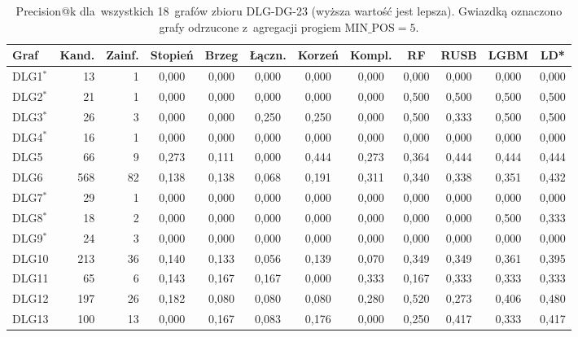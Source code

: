 \begin{table}[ht]
\centering
\caption[Precision@k dla~wszystkich 18~grafów DLG-DG-23]{Precision@k dla~wszystkich 18~grafów zbioru DLG-DG-23 (wyższa wartość jest lepsza). Gwiazdką oznaczono grafy odrzucone z~agregacji progiem $\mathrm{MIN\_POS} = 5$.}
\label{tab:dodb-precision-at-k}
\footnotesize
\setlength{\tabcolsep}{3.5pt}
\begin{tabular}{lrrccccccccc}
\toprule
\textbf{Graf} & \textbf{Kand.} & \textbf{Zainf.} & \textbf{Stopień} & \textbf{Brzeg} & \textbf{Łączn.} & \textbf{Korzeń} & \textbf{Kompl.} & \textbf{RF} & \textbf{RUSB} & \textbf{LGBM} & \textbf{LD*} \\
\midrule
DLG1$^{*}$ & 13 & 1 & 0{,}000 & 0{,}000 & 0{,}000 & 0{,}000 & 0{,}000 & 0{,}000 & 0{,}000 & 0{,}000 & 0{,}000 \\
DLG2$^{*}$ & 21 & 1 & 0{,}000 & 0{,}000 & 0{,}000 & 0{,}000 & 0{,}000 & 0{,}500 & 0{,}500 & 0{,}500 & 0{,}500 \\
DLG3$^{*}$ & 26 & 3 & 0{,}000 & 0{,}000 & 0{,}250 & 0{,}250 & 0{,}000 & 0{,}500 & 0{,}333 & 0{,}500 & 0{,}500 \\
DLG4$^{*}$ & 16 & 1 & 0{,}000 & 0{,}000 & 0{,}000 & 0{,}000 & 0{,}000 & 0{,}000 & 0{,}000 & 0{,}000 & 0{,}000 \\
DLG5 & 66 & 9 & 0{,}273 & 0{,}111 & 0{,}000 & 0{,}444 & 0{,}273 & 0{,}364 & 0{,}444 & 0{,}444 & 0{,}444 \\
DLG6 & 568 & 82 & 0{,}138 & 0{,}138 & 0{,}068 & 0{,}191 & 0{,}311 & 0{,}340 & 0{,}338 & 0{,}351 & 0{,}432 \\
DLG7$^{*}$ & 29 & 1 & 0{,}000 & 0{,}000 & 0{,}000 & 0{,}000 & 0{,}000 & 0{,}000 & 0{,}000 & 0{,}000 & 0{,}000 \\
DLG8$^{*}$ & 18 & 2 & 0{,}000 & 0{,}000 & 0{,}000 & 0{,}000 & 0{,}000 & 0{,}000 & 0{,}000 & 0{,}500 & 0{,}333 \\
DLG9$^{*}$ & 24 & 3 & 0{,}000 & 0{,}000 & 0{,}000 & 0{,}000 & 0{,}000 & 0{,}000 & 0{,}000 & 0{,}000 & 0{,}000 \\
DLG10 & 213 & 36 & 0{,}140 & 0{,}133 & 0{,}056 & 0{,}139 & 0{,}070 & 0{,}349 & 0{,}349 & 0{,}361 & 0{,}395 \\
DLG11 & 65 & 6 & 0{,}143 & 0{,}167 & 0{,}167 & 0{,}000 & 0{,}333 & 0{,}167 & 0{,}333 & 0{,}333 & 0{,}333 \\
DLG12 & 197 & 26 & 0{,}182 & 0{,}080 & 0{,}080 & 0{,}080 & 0{,}280 & 0{,}520 & 0{,}273 & 0{,}406 & 0{,}480 \\
DLG13 & 100 & 13 & 0{,}000 & 0{,}167 & 0{,}083 & 0{,}176 & 0{,}000 & 0{,}250 & 0{,}417 & 0{,}333 & 0{,}417 \\

\end{tabular}
\end{table}
